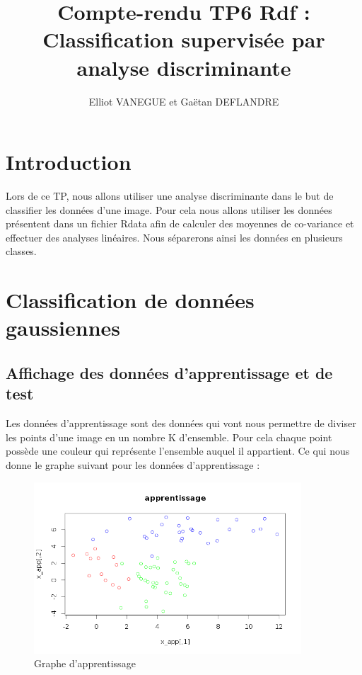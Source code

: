 \documentclass[a4paper,11pt]{article}
\title{Compte-rendu TP6 Rdf : Classification supervisée par analyse discriminante}
\author{Elliot VANEGUE et Gaëtan DEFLANDRE}
\begin{document}


  \maketitle
  
  \mbox{}
  \newpage
  \clearpage
  
  \section*{Introduction}
  Lors de ce TP, nous allons utiliser une analyse discriminante dans le but de classifier les données
  d'une image. Pour cela nous allons utiliser les données présentent dans un fichier Rdata afin 
  de calculer des moyennes de co-variance et effectuer des analyses linéaires. Nous séparerons
  ainsi les données en plusieurs classes.

  \section{Classification de données gaussiennes}
  \subsection{Affichage des données d'apprentissage et de test}
  Les données d'apprentissage sont des données qui vont nous permettre de diviser les points d'une
  image en un nombre K d'ensemble. Pour cela chaque point possède une couleur qui représente l'ensemble
  auquel il appartient.
  Ce qui nous donne le graphe suivant pour les données d'apprentissage : 
  
  \begin{figure}[h]
   \center
   \includegraphics[width=10cm]{ensemble_apprentissage.png}
   \caption{Graphe d'apprentissage}
  \end{figure}
\end{document}
